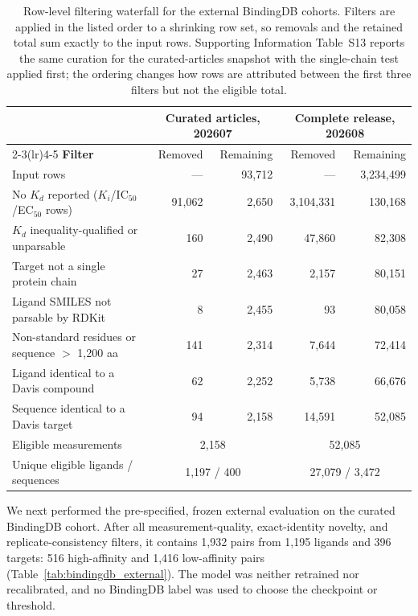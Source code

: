 \documentclass[fleqn,10pt]{wlscirep}
\begin{document}
\begin{table}[htbp]
\centering
\small
\caption{Row-level filtering waterfall for the external BindingDB cohorts.
  Filters are applied in the listed order to a shrinking row set, so removals
  and the retained total sum exactly to the input rows.  Supporting Information
  Table~S13 reports the same curation for the curated-articles snapshot with the
  single-chain test applied first; the ordering changes how rows are attributed
  between the first three filters but not the eligible total.}
\label{tab:bindingdb_curation}
\begin{tabular}{lrrrr}
\toprule
 & \multicolumn{2}{c}{\textbf{Curated articles, 202607}} &
   \multicolumn{2}{c}{\textbf{Complete release, 202608}} \\
\cmidrule(lr){2-3}\cmidrule(lr){4-5}
\textbf{Filter} & Removed & Remaining & Removed & Remaining \\
\midrule
Input rows                                 & ---     & 93{,}712 & ---           & 3{,}234{,}499 \\
No $K_d$ reported ($K_i$/IC$_{50}$/EC$_{50}$ rows) & 91{,}062 & 2{,}650 & 3{,}104{,}331 & 130{,}168 \\
$K_d$ inequality-qualified or unparsable   & 160     & 2{,}490  & 47{,}860      & 82{,}308 \\
Target not a single protein chain          & 27      & 2{,}463  & 2{,}157       & 80{,}151 \\
Ligand SMILES not parsable by RDKit        & 8       & 2{,}455  & 93            & 80{,}058 \\
Non-standard residues or sequence $>$ 1{,}200 aa & 141 & 2{,}314 & 7{,}644      & 72{,}414 \\
Ligand identical to a Davis compound       & 62      & 2{,}252  & 5{,}738       & 66{,}676 \\
Sequence identical to a Davis target       & 94      & 2{,}158  & 14{,}591      & 52{,}085 \\
\midrule
Eligible measurements                      & \multicolumn{2}{c}{2{,}158} & \multicolumn{2}{c}{52{,}085} \\
Unique eligible ligands / sequences        & \multicolumn{2}{c}{1{,}197 / 400} & \multicolumn{2}{c}{27{,}079 / 3{,}472} \\
\bottomrule
\end{tabular}
\end{table}
\endgroup

We next performed the pre-specified, frozen external evaluation on the curated
BindingDB cohort.  After all measurement-quality, exact-identity novelty, and
replicate-consistency filters, it contains 1{,}932 pairs from 1{,}195 ligands
and 396 targets: 516 high-affinity and 1{,}416 low-affinity pairs
(Table~\ref{tab:bindingdb_external}).  The model was neither retrained nor
recalibrated, and no BindingDB label was used to choose the checkpoint or
threshold.
\end{document}
